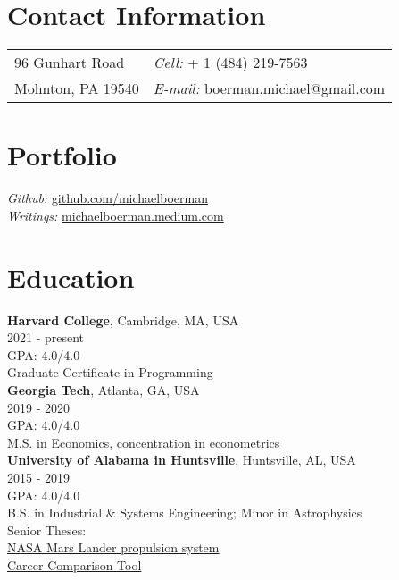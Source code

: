 \documentclass[margin,line]{res}
\begin{document}

\begin{resume}
\section{\sc Contact Information}
\vspace{.05in}
\begin{tabular}{@{}p{2in}p{4in}}
96 Gunhart Road   & {\it Cell:}  + 1 (484) 219-7563 \\  
Mohnton, PA 19540 & {\it E-mail:}  {\ttfamily boerman.michael@gmail.com} \\
\end{tabular}

\section{\sc Portfolio}
{\it Github:} \href{https://github.com/michaelboerman}{\ttfamily github.com/michaelboerman}\\  
{\it Writings:} \href{https://michaelboerman.medium.com/}{\ttfamily michaelboerman.medium.com}\\  


\section{\sc Education}
{\bf Harvard College}, Cambridge, MA, USA\\
2021 - present\\
GPA: 4.0/4.0\\
Graduate Certificate in Programming\\

{\bf Georgia Tech}, Atlanta, GA, USA\\
2019 - 2020\\
GPA: 4.0/4.0\\
M.S. in Economics, concentration in econometrics\\

{\bf University of Alabama in Huntsville}, Huntsville, AL, USA\\
2015 - 2019\\
GPA: 4.0/4.0\\
B.S. in Industrial \& Systems Engineering; Minor in Astrophysics\\
Senior Theses: \\
\hspace{5mm}{\it -- Systems Engineering:} \href{https://tinyurl.com/ISEEM-SD}{NASA Mars Lander propulsion system}\\
\hspace{5mm}{\it -- Economic Decision Analysis:} \href{http://tinyurl.com/BoermanCareerChoice
}{Career Comparison Tool}




\end{resume}
\end{document}
